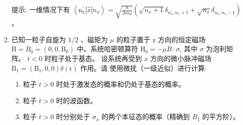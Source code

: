 \begin{enumerate}
\begin{enumerate}
	
\end{enumerate}
提示: 一维情况下有 $\left\langle\mathrm{n}_{\mathrm{x}}^{\prime}|\hat{x}| n_{x}\right\rangle=\sqrt{\frac{\hbar}{2 m \omega}}\left(\sqrt{n_{x}+1} \delta_{n_{x}^{\prime},n_{x}+1}+\sqrt{n_{x}} \delta_{n_{x}^{\prime},n_{x}-1}\right)$。


\newpage
\item 
已知一粒子自旋为 $1 / 2$ 、磁矩为 $\mu$ 的粒子置于 $\mathrm{z}$ 方向的恒定磁场
$\mathrm{B}=B_{0}=\left(0,0, \mathrm{B}_{0}\right)$ 中。系统哈密顿算符 $\mathrm{H_{0}}=-\mu B \cdot \sigma$, 其中 $\sigma$ 为泡利矩阵。
$t<0$ 时粒子处于基态。 设系统再受到 $x$ 方向的微小脉冲磁场 $\mathrm{B}_{1}=\left(\mathrm{B}_{1}, 0,0\right) \delta(\mathrm{t})$ 作用。请
使用微扰（一级近似）进行计算:
\begin{enumerate}
\item
粒子 $t>0$ 时处于激发态的概率和仍处于基态的概率。
\item
粒子 $t>0$ 时的波函数。
\item
粒子 $t>0$ 时分别处于 $\sigma_{x}$ 的两个本征态的概率（精确到 $B_{1}$ 的平方阶）。


\end{enumerate}
\end{enumerate}
